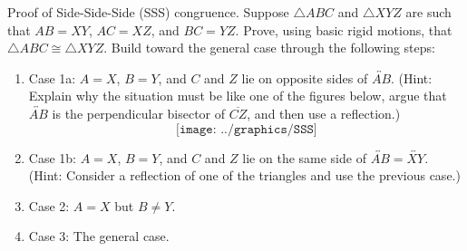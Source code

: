 \begin{prob}
Proof of Side-Side-Side (SSS) congruence.  Suppose $\triangle ABC$ and $\triangle XYZ$ are such that $AB=XY$, $AC=XZ$, and $BC=YZ$.  Prove, using basic rigid motions, that $\triangle ABC \cong \triangle XYZ$.  Build toward the general case through the following steps:  
\begin{enumerate}
\item Case 1a:  $A=X$, $B=Y$, and $C$ and $Z$ lie on opposite sides of $\overleftrightarrow{AB}$.  (Hint:  Explain why the situation must be like one of the figures below, argue that $\overleftrightarrow{AB}$ is the perpendicular bisector of $\overline{CZ}$, and then use a reflection.)
$$\texttt{[image: ../graphics/SSS]}$$
\item Case 1b:  $A=X$, $B=Y$, and $C$ and $Z$ lie on the same side of $\overleftrightarrow{AB}=\overleftrightarrow{XY}$.  (Hint: Consider a reflection of one of the triangles and use the previous case.)  
\item Case 2:  $A=X$ but $B \ne Y$.
\item Case 3: The general case.  
\end{enumerate}
\end{prob}



